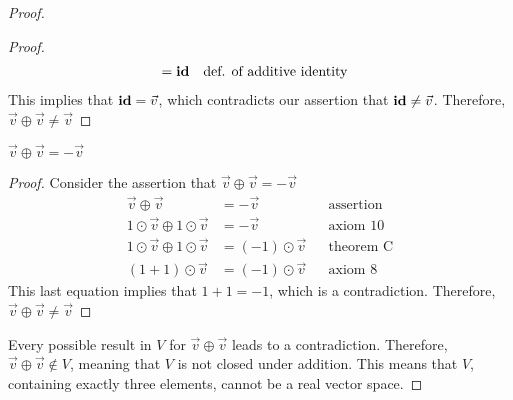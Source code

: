 \begin{proof}
\begin{enumerate}
\begin{proof}
\begin{align*}
                                               & = \operatorname{\textbf{id}}                                      &  & \text{def. of additive identity}
      \end{align*}
      This implies that $\operatorname{\textbf{id}} = \vec{v}$, which contradicts our assertion that $\operatorname{\textbf{id}} \neq \vec{v}$. Therefore, $\vec{v} \oplus \vec{v} \neq \vec{v}$
    \end{proof}
     $\vec{v} \oplus \vec{v} = -\vec{v}$
    \begin{proof}
      Consider the assertion that $\vec{v} \oplus \vec{v} = -\vec{v}$
      \begin{align*}
        \vec{v} \oplus \vec{v}                 & = -\vec{v}           &  & \text{assertion} \\
        1 \odot \vec{v} \oplus 1 \odot \vec{v} & = -\vec{v}           &  & \text{axiom 10}  \\
        1 \odot \vec{v} \oplus 1 \odot \vec{v} & = (-1) \odot \vec{v} &  & \text{theorem C} \\
        (1+1) \odot \vec{v}                    & = (-1) \odot \vec{v} &  & \text{axiom 8}
      \end{align*}
      This last equation implies that $1+1 = -1$, which is a contradiction. Therefore, $\vec{v} \oplus \vec{v} \neq \vec{v}$
    \end{proof}
  \end{enumerate}
  Every possible result in $V$ for $\vec{v} \oplus \vec{v}$ leads to a contradiction. Therefore, $\vec{v} \oplus \vec{v} \not \in V$, meaning that $V$ is not closed under addition. This means that $V$, containing exactly three elements, cannot be a real vector space.
\end{proof}
\newpage
